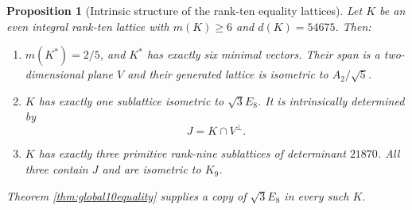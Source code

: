 \documentclass[11pt,a4paper]{article}
\newtheorem{proposition}[theorem]{Proposition}
\theoremstyle{remark}\newtheorem{remark}[theorem]{Remark}
\begin{document}
\begin{proposition}[Intrinsic structure of the rank-ten equality lattices]
\label{prop:intrinsic-rank-ten}
Let $K$ be an even integral rank-ten lattice with $m(K)\ge6$ and $d(K)=54675$. Then:
\begin{enumerate}
\item $m(K^*)=2/5$, and $K^*$ has exactly six minimal vectors. Their span
      is a two-dimensional plane $V$ and their generated lattice is
      isometric to $A_2/\sqrt5$.
\item $K$ has exactly one sublattice isometric to $\sqrt3E_8$. It is
      intrinsically determined by
      \[
         J=K\cap V^\perp.
      \]
\item $K$ has exactly three primitive rank-nine sublattices of determinant
      $21870$. All three contain $J$ and are isometric to $K_9$.
\end{enumerate}
Theorem \ref{thm:global10equality} supplies a copy of $\sqrt3E_8$ in every such $K$.
\end{proposition}
\end{document}
